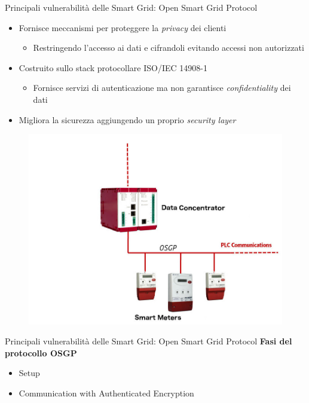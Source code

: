 \begin{frame}{Principali vulnerabilità delle Smart Grid: Open Smart Grid Protocol}
	\begin{itemize}[<+- | alert@+>]
		\item Fornisce meccanismi per proteggere la \emph{privacy} dei clienti
		\begin{itemize}[<+- | alert@+>]
			\item Restringendo l'accesso ai dati e cifrandoli evitando accessi non autorizzati
		\end{itemize}
		\item Costruito sullo stack protocollare ISO/IEC 14908-1
		\begin{itemize}[<+- | alert@+>]
			\item Fornisce servizi di autenticazione ma non garantisce \emph{confidentiality} dei dati
		\end{itemize}
		\item Migliora la sicurezza aggiungendo un proprio \emph{security layer}
	\end{itemize}
	\begin{figure}[h] 
		\includegraphics[scale=0.15,cfbox=blue_slides 1pt 0pt]{imgs/aggregator.jpg}
	\end{figure}
\end{frame}

\begin{frame}{Principali vulnerabilità delle Smart Grid: Open Smart Grid Protocol}
	\textbf{Fasi del protocollo OSGP}
	\begin{itemize}
		\item Setup
		\item Communication with Authenticated Encryption
	\end{itemize}
\end{frame}

